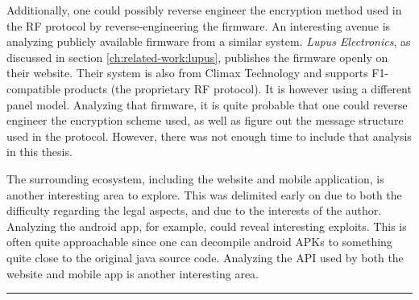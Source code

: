 Additionally, one could possibly reverse engineer the encryption method used in the RF protocol by reverse-engineering the firmware. An interesting avenue is analyzing publicly available firmware from a similar system. \textit{Lupus Electronics}, as discussed in section \ref{ch:related-work:lupus}, publishes the firmware openly on their website. Their system is also from Climax Technology and supports F1-compatible products (the proprietary RF protocol). It is however using a different panel model. Analyzing that firmware, it is quite probable that one could reverse engineer the encryption scheme used, as well as figure out the message structure used in the protocol. However, there was not enough time to include that analysis in this thesis.

The surrounding ecosystem, including the website and mobile application, is another interesting area to explore. This was delimited early on due to both the difficulty regarding the legal aspects, and due to the interests of the author. Analyzing the android app, for example, could reveal interesting exploits. This is often quite approachable since one can decompile android APKs to something quite close to the original java source code. Analyzing the API used by both the website and mobile app is another interesting area.

\noindent\rule{\textwidth}{0.4mm}
